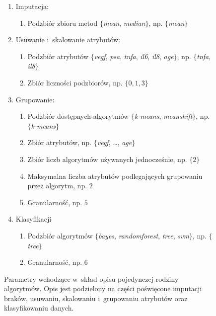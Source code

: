 \documentclass[../thesis.tex]{subfiles}
\begin{document}
\begin{figure}[h]
\centering
\begin{framed}
  \begin{enumerate}
    \item Imputacja: 
    \begin{enumerate}
      \item Podzbiór zbioru metod $\{$\emph{mean}, \emph{median}$\}$, np. $\{$\emph{mean}$\}$
    \end{enumerate}
    \item Usuwanie i~skalowanie atrybutów:
    \begin{enumerate}
      \item Podzbiór atrybutów $\{$\emph{vegf}, \emph{psa}, \emph{tnfa}, \emph{il6}, \emph{il8}, \emph{age}$\}$, np. $\{$\emph{tnfa}, \emph{il8}$\}$
      \item Zbiór liczności podzbiorów, np. $\{0, 1, 3\}$
    \end{enumerate}
    \item Grupowanie:
    \begin{enumerate}
      \item Podzbiór dostępnych algorytmów $\{$\emph{k-means}, \emph{meanshift}$\}$, np. $\{$\emph{k-means}$\}$
      \item Zbiór atrybutów, np. $\{$\emph{vegf}, \ldots, \emph{age}$\}$
      \item Zbiór liczb algorytmów używanych jednocześnie, np. $\{2\}$
      \item Maksymalna liczba atrybutów podlegających grupowaniu przez algorytm, np. $2$
      \item Granularność, np. $5$
    \end{enumerate}
    \item Klasyfikacji
    \begin{enumerate}
      \item Podzbiór algorytmów $\{$\emph{bayes}, \emph{randomforest}, \emph{tree}, \emph{svm}$\}$, np. $\{$\emph{tree}$\}$
      \item Granularność, np. $6$
    \end{enumerate}
  \end{enumerate}
\end{framed}
\caption{Parametry wchodzące w~skład opisu pojedynczej rodziny algorytmów. Opis jest podzielony na części poświęcone imputacji braków, usuwaniu, skalowaniu i~grupowaniu atrybutów oraz klasyfikowaniu danych.}
\label{req:as}
\end{figure}
\end{document}
